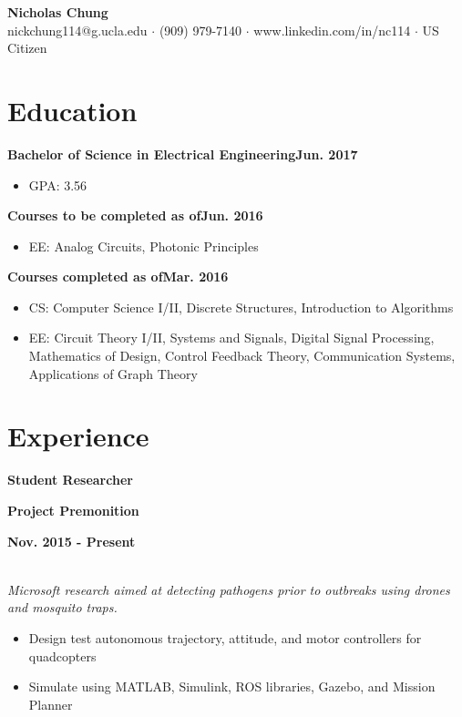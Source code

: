 \documentclass[12pt]{article}
\newcommand\textbox[1]{\parbox{.333\textwidth}{#1}}
\newcommand{\textlcr}[3]{\textbox{\textbf{#1}\hfill}\textbox{\hfil \textbf{#2}\hfil}\textbox{\hfill \textbf{#3}}}
\begin{document}
\begin{center}
	\textbf{\LARGE Nicholas Chung} \\ \vspace{.5ex}
	nickchung114@g.ucla.edu $\cdot$ (909) 979-7140 $\cdot$ www.linkedin.com/in/nc114 $\cdot$ US Citizen
\end{center}

\vspace{-8pt}
\smallskip
\section*{Education}
\vspace*{-1em}\makebox[\linewidth]{\rule{\textwidth}{0.4pt}}

\textbf{Bachelor of Science in Electrical Engineering}\hfill\textbf{Jun. 2017}
\begin{itemize}
\item GPA: 3.56
\end{itemize}

\textbf{Courses to be completed as of}\hfill\textbf{Jun. 2016}
\begin{itemize}
\item EE: Analog Circuits, Photonic Principles
\end{itemize}

\textbf{Courses completed as of}\hfill\textbf{Mar. 2016}
\begin{itemize}
\item CS: Computer Science I/II, Discrete Structures, Introduction to Algorithms
\item EE: Circuit Theory I/II, Systems and Signals, Digital Signal Processing, Mathematics of Design, Control Feedback Theory, Communication Systems, Applications of Graph Theory
\end{itemize}

\section*{Experience}
\vspace*{-1em}\makebox[\linewidth]{\rule{\textwidth}{0.4pt}}

\textlcr{Student Researcher}{Project Premonition}{Nov. 2015 - Present} \\
\textit{Microsoft research aimed at detecting pathogens prior to outbreaks using drones and mosquito traps.}
\begin{itemize}
\item Design test autonomous trajectory, attitude, and motor controllers for quadcopters
\item Simulate using MATLAB, Simulink, ROS libraries, Gazebo, and Mission Planner
\end{itemize}
\end{document}
